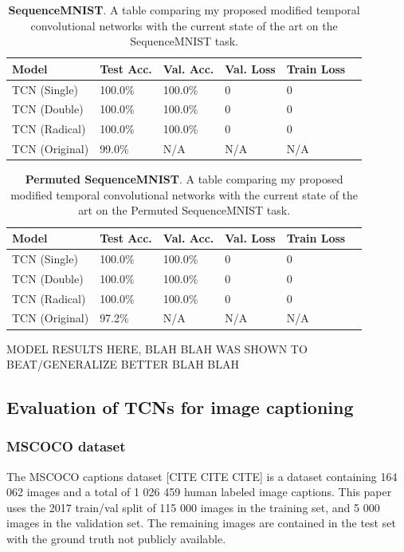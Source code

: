 \documentclass[a4paper, twoside]{article}
\begin{document}
\begin{table}
\begin{center}
    \begin{tabular}{| l | l | l | l | l | l |}
    \hline
    Model & Test Acc. & Val. Acc. & Val. Loss & Train Loss\\ \hline \hline
    TCN (Single) & 100.0\% & 100.0\% & 0 & 0 \\ \hline
    TCN (Double) & 100.0\% & 100.0\% & 0 & 0 \\ \hline
    TCN (Radical) & 100.0\% & 100.0\% & 0 & 0 \\ \hline
    TCN (Original) \cite{tcn} & 99.0\% & N/A & N/A & N/A \\ \hline
    \end{tabular}
    \caption{\textbf{SequenceMNIST}. A table comparing my proposed modified temporal convolutional networks with the current state of the art on the SequenceMNIST task.} \label{tabseqmnist}
\end{center}
\end{table}

\begin{table}
\begin{center}
    \begin{tabular}{| l | l | l | l | l | l |}
    \hline
    Model & Test Acc. & Val. Acc. & Val. Loss & Train Loss\\ \hline \hline
    TCN (Single) & 100.0\% & 100.0\% & 0 & 0 \\ \hline
    TCN (Double) & 100.0\% & 100.0\% & 0 & 0 \\ \hline
    TCN (Radical) & 100.0\% & 100.0\% & 0 & 0 \\ \hline
    TCN (Original) \cite{tcn} & 97.2\% & N/A & N/A & N/A \\ \hline
    \end{tabular}
    \caption{\textbf{Permuted SequenceMNIST}. A table comparing my proposed modified temporal convolutional networks with the current state of the art on the Permuted SequenceMNIST task.} \label{tabseqmnist}
\end{center}
\end{table}

MODEL RESULTS HERE, BLAH BLAH WAS SHOWN TO BEAT/GENERALIZE BETTER BLAH BLAH


\subsection{Evaluation of TCNs for image captioning}
\subsubsection{MSCOCO dataset}
The MSCOCO captions dataset [CITE CITE CITE] is a dataset containing 164 062 images and a total of 1 026 459 human labeled image captions. This paper uses the 2017 train/val split of 115 000 images in the training set, and 5 000 images in the validation set. The remaining images are contained in the test set with the ground truth not publicly available.
\end{document}
